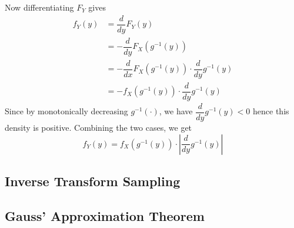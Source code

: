 \documentclass[11pt]{report} %
\begin{document}
Now differentiating $F_{Y}$ gives 
\begin{align}
f_{Y}\left(y\right) &= \dfrac{d}{dy}F_{Y}\left(y\right) \\
&= -\dfrac{d}{dy}F_{X}\left(g^{-1}\left(y\right)\right) \\
&= -\dfrac{d}{dx}F_{X}\left(g^{-1}\left(y\right)\right)\cdot\dfrac{d}{dy}g^{-1}\left(y\right) \\
&= -f_{X}\left(g^{-1}\left(y\right)\right)\cdot\dfrac{d}{dy}g^{-1}\left(y\right)
\end{align}
Since by monotonically decreasing $g^{-1}\left(\cdot\right)$, we have $\dfrac{d}{dy}g^{-1}\left(y\right) < 0$ hence this density is positive. Combining the two cases, we get
\begin{equation}
f_{Y}\left(y\right) =  f_{X}\left(g^{-1}\left(y\right)\right)\cdot\left|\dfrac{d}{dy}g^{-1}\left(y\right)\right|
\end{equation}

\subsection{Inverse Transform Sampling}

\subsection{Gauss' Approximation Theorem \cite{Blom1989}}
\end{document}
